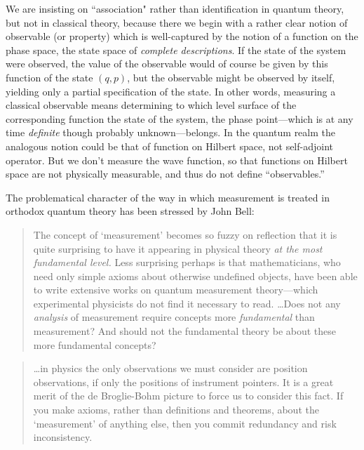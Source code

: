 \documentclass[12pt]{article}
\begin{document}
We are insisting on ``association" rather than identification in
quantum theory, but not in classical theory, because there we begin
with a rather clear notion of observable (or property) which is
well-captured by the notion of a function on the phase space, the
state space of {\it complete descriptions}.  If the state of the
system were observed, the value of the observable would of course be
given by this function of the state $(q,p)$, but the observable might
be observed by itself, yielding only a partial specification of the
state.  In other words, measuring a classical observable means
determining to which level surface of the corresponding function the
state of the system, the phase point---which is at any time {\it
   definite} though probably unknown---belongs.  In the quantum realm
the analogous notion could be that of function on Hilbert space, not
self-adjoint operator.  But we don't measure the wave function, so
that functions on Hilbert space are not physically measurable, and
thus do not define ``observables.''  \medskip

The problematical character of the way in which measurement is treated
in orthodox quantum theory has been stressed by John Bell:


\begin{quotation}\small\noindent
   The concept of `measurement' becomes so fuzzy on reflection that it
   is quite surprising to have it appearing in physical theory {\it at
     the most fundamental level.\/} Less surprising perhaps is that
   mathematicians, who need only simple axioms about otherwise
   undefined objects, have been able to write extensive works on
   quantum measurement theory---which experimental physicists do not
   find it necessary to read. \dots Does not any {\it analysis\/} of
   measurement require concepts more {\it fundamental\/} than
   measurement?  And should not the fundamental theory be about these
   more fundamental concepts?~\cite{Bel81}
\end{quotation}

\begin{quotation}\small\noindent
   \dots in physics the only observations we must consider are position
   observations, if only the positions of instrument pointers.  It is a
   great merit of the de Broglie-Bohm picture to force us to consider
   this fact.  If you make axioms, rather than definitions and
   theorems, about the `measurement' of anything else, then you commit
   redundancy and risk inconsistency.~\cite{Bel82}
\end{quotation}
%
\end{document}
